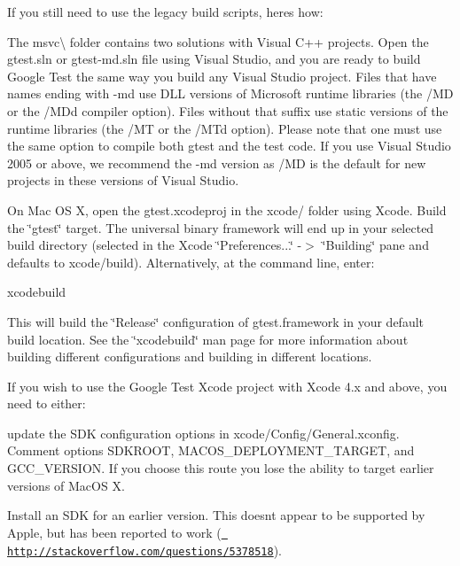 If you still need to use the legacy build scripts, here\textquotesingle{}s how\+:

The msvc\textbackslash{} folder contains two solutions with Visual C++ projects. Open the {\ttfamily gtest.\+sln} or {\ttfamily gtest-\/md.\+sln} file using Visual Studio, and you are ready to build Google Test the same way you build any Visual Studio project. Files that have names ending with -\/md use D\+LL versions of Microsoft runtime libraries (the /\+MD or the /\+M\+Dd compiler option). Files without that suffix use static versions of the runtime libraries (the /\+MT or the /\+M\+Td option). Please note that one must use the same option to compile both gtest and the test code. If you use Visual Studio 2005 or above, we recommend the -\/md version as /\+MD is the default for new projects in these versions of Visual Studio.

On Mac OS X, open the {\ttfamily gtest.\+xcodeproj} in the {\ttfamily xcode/} folder using Xcode. Build the \char`\"{}gtest\char`\"{} target. The universal binary framework will end up in your selected build directory (selected in the Xcode \char`\"{}\+Preferences...\char`\"{} -\/$>$ \char`\"{}\+Building\char`\"{} pane and defaults to xcode/build). Alternatively, at the command line, enter\+: \begin{DoxyVerb}xcodebuild
\end{DoxyVerb}


This will build the \char`\"{}\+Release\char`\"{} configuration of gtest.\+framework in your default build location. See the \char`\"{}xcodebuild\char`\"{} man page for more information about building different configurations and building in different locations.

If you wish to use the Google Test Xcode project with Xcode 4.\+x and above, you need to either\+:


\begin{DoxyItemize}
\item update the S\+DK configuration options in xcode/\+Config/\+General.\+xconfig. Comment options {\ttfamily S\+D\+K\+R\+O\+OT}, {\ttfamily M\+A\+C\+O\+S\+\_\+\+D\+E\+P\+L\+O\+Y\+M\+E\+N\+T\+\_\+\+T\+A\+R\+G\+ET}, and {\ttfamily G\+C\+C\+\_\+\+V\+E\+R\+S\+I\+ON}. If you choose this route you lose the ability to target earlier versions of Mac\+OS X.
\item Install an S\+DK for an earlier version. This doesn\textquotesingle{}t appear to be supported by Apple, but has been reported to work (\href{http://stackoverflow.com/questions/5378518}\texttt{ http\+://stackoverflow.\+com/questions/5378518}).
\end{DoxyItemize}

